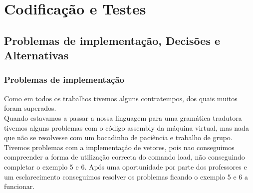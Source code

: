 \documentclass{report}
\begin{document}
\chapter{Codificação e Testes}
\section{Problemas de implementação, Decisões e Alternativas}
\subsection{Problemas de implementação}
\indent
Como em todos os trabalhos tivemos alguns contratempos, dos quais muitos foram superados.\\
\indent
Quando estavamos a passar a nossa linguagem para uma gramática tradutora tivemos alguns problemas com o código assembly da máquina virtual, mas nada que não se resolvesse com um bocadinho de paciência e trabalho de grupo.\\
\indent
Tivemos problemas com a implementaçáo de vetores, pois nao conseguimos compreender a forma de utilização correcta do comando load, não conseguindo completar o exemplo 5 e 6.  Após uma oportunidade por parte dos professores e um esclarecimento conseguimos resolver os problemas ficando o exemplo 5 e 6 a funcionar.
   
\end{document}
